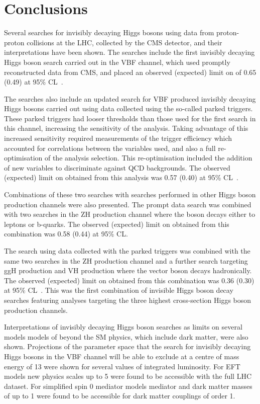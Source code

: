 \chapter{Conclusions}
\label{chap:conclusions}
Several searches for invisibly decaying Higgs bosons using data from proton-proton collisions at the LHC, collected by the CMS detector, and their interpretations have been shown. The searches include the first invisibly decaying Higgs boson search carried out in the \ac{VBF} channel, which used promptly reconstructed data from CMS, and placed an observed (expected) limit on \BRinv of 0.65 (0.49) at 95\% \ac{CL}~\cite{Chatrchyan:2014tja}.

The searches also include an updated search for \ac{VBF} produced invisibly decaying Higgs bosons carried out using data collected using the so-called parked triggers. These parked triggers had looser thresholds than those used for the first search in this channel, increasing the sensitivity of the analysis. Taking advantage of this increased sensitivity required measurements of the trigger efficiency which accounted for correlations between the variables used, and also a full re-optimisation of the analysis selection. This re-optimisation included the addition of new variables to discriminate against \ac{QCD} backgrounds. The observed (expected) limit on \BRinv obtained from this analysis was 0.57 (0.40) at 95\% \ac{CL}~\cite{CMS-PAS-HIG-14-038}.

Combinations of these two searches with searches performed in other Higgs boson production channels were also presented. The prompt data search was combined with two searches in the ZH production channel where the \PZ boson decays either to leptons or b-quarks. The observed (expected) limit on \BRinv obtained from this combination was 0.58 (0.44) at 95\% \ac{CL}.

The search using data collected with the parked triggers was combined with the same two searches in the ZH production channel and a further search targeting \ac{ggH} production and VH production where the vector boson decays hadronically. The observed (expected) limit on \BRinv obtained from this combination was 0.36 (0.30) at 95\% \ac{CL}~\cite{CMS-PAS-HIG-15-012}. This was the first combination of invisible Higgs boson decay searches featuring analyses targeting the three highest cross-section Higgs boson production channels.

Interpretations of invisibly decaying Higgs boson searches as limits on several models models of beyond the \ac{SM} physics, which include dark matter, were also shown. Projections of the parameter space that the search for invisibly decaying Higgs bosons in the \ac{VBF} channel will be able to exclude at a centre of mass energy of 13 \TeV were shown for several values of integrated luminosity. For \ac{EFT} models new physics scales up to 5 \TeV were found to be accessible with the full LHC dataset. For simplified spin 0 mediator models mediator and dark matter masses of up to 1 \TeV were found to be accessible for dark matter couplings of order 1.

